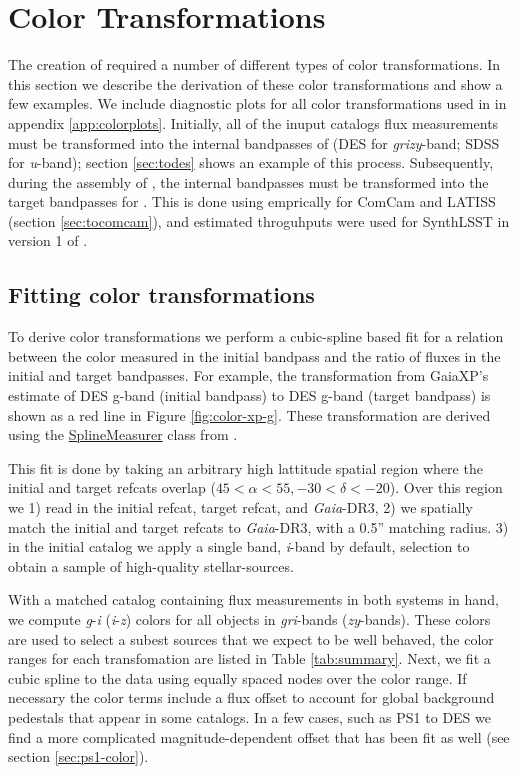 \section{Color Transformations}
\label{sec:colors}
The creation of \monster required a number of different types of color transformations. 
In this section we describe the derivation of these color transformations and show a few examples. 
We include diagnostic plots for all color transformations used in \monster in appendix \ref{app:colorplots}. 
Initially, all of the inuput catalogs flux measurements must be transformed into the internal bandpasses of \monster (DES for \emph{grizy}-band; SDSS for \emph{u}-band); section \ref{sec:todes} shows an example of this process. 
Subsequently, during the assembly of \monster, the internal bandpasses must be transformed into the target bandpasses for \monster. 
This is done using emprically for ComCam and LATISS (section \ref{sec:tocomcam}), and estimated throguhputs were used for SynthLSST in version 1 of \monster. 


\subsection{Fitting color transformations}
To derive color transformations we perform a cubic-spline based fit for a relation between the color measured in the initial bandpass and the ratio of fluxes in the initial and target bandpasses.
For example, the transformation from GaiaXP's estimate of DES g-band (initial bandpass) to DES g-band (target bandpass) is shown as a red line in Figure \ref{fig:color-xp-g}. 
These transformation are derived using the \href{https://github.com/lsst-dm/the_monster/blob/main/python/lsst/the/monster/measure_colorterms.py}{SplineMeasurer} class from \monster. 

This fit is done by taking an arbitrary high lattitude spatial region where the initial and target refcats overlap ($45 < \alpha <  55, -30 < \delta < -20 $). 
Over this region we 1) read in the initial refcat, target refcat, and \emph{Gaia}-DR3, 2) we spatially match the initial and target refcats to \emph{Gaia}-DR3, with a 0.5'' matching radius. 3) in the initial catalog we apply a single band, \textit{i}-band by default, selection to obtain a sample of high-quality stellar-sources.  

With a matched catalog containing flux measurements in both systems in hand, we compute \emph{g}-\emph{i} (\emph{i}-\emph{z}) colors for all objects in \emph{gri}-bands (\emph{zy}-bands). 
These colors are used to select a subest sources that we expect to be well behaved, the color ranges for each transfomation are listed in Table \ref{tab:summary}.
Next, we fit a cubic spline to the data using equally spaced nodes over the color range.
If necessary the color terms include a flux offset to account for global background pedestals that appear in some catalogs. 
In a few cases, such as PS1 to DES we find a more complicated magnitude-dependent offset that has been fit as well (see section \ref{sec:ps1-color}).

